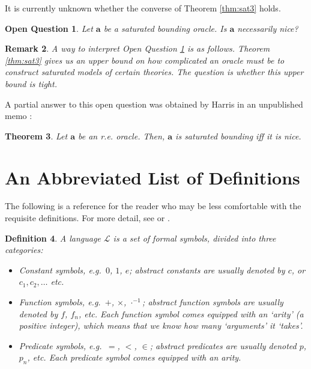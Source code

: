 \documentclass{article}
\newtheorem{theorem}{Theorem}[section]
\newtheorem{remark}[theorem]{Remark}
\newtheorem{definition}[theorem]{Definition}
\newtheorem{openq}[theorem]{Open Question}
\theoremstyle{nonumberplain}
\newcommand{\Lang}{\mathcal{L}}
\begin{document}
It is currently unknown whether the converse of Theorem \ref{thm:sat3} holds.

\begin{openq}\label{openq}
Let $\mathbf{a}$ be a saturated bounding oracle. Is $\mathbf{a}$ necessarily nice?
\end{openq}

\begin{remark}
A way to interpret Open Question \ref{openq} is as follows. Theorem \ref{thm:sat3} gives us an upper bound on how complicated an oracle must be to construct saturated models of certain theories. The question is whether this upper bound is tight.
\end{remark}

A partial answer to this open question was obtained by Harris in an unpublished memo \cite{ken2}:

\begin{theorem}
Let $\mathbf{a}$ be an r.e. oracle. Then, $\mathbf{a}$ is saturated bounding iff it is nice.
\end{theorem}


\pagebreak


\appendix

\section{An Abbreviated List of Definitions}\label{appendix:1}

The following is a reference for the reader who may be less comfortable with the requisite definitions. For more detail, see \cite{cnk} or \cite{shoenfield}.

\begin{definition}
A \emph{language} $\Lang$ is a set of formal symbols, divided into three categories:
\begin{itemize}
\item Constant symbols, e.g.\ $0$, $1$, $e$; abstract constants are usually denoted by $c$, or $c_1, c_2, \dots$ etc.
\item Function symbols, e.g.\ $+$, $\times$, $\cdot^{-1}$; abstract function symbols are usually denoted by $f$, $f_n$, etc. Each function symbol comes equipped with an `arity' (a positive integer), which means that we know how many `arguments' it `takes'.
\item Predicate symbols, e.g.\ $=$, $<$, $\in$; abstract predicates are usually denoted $p$, $p_n$, etc. Each predicate symbol comes equipped with an arity.
\end{itemize}
\end{definition}
\end{document}
